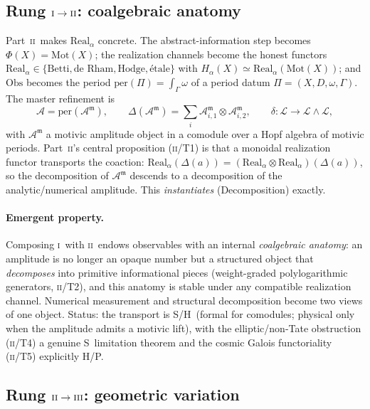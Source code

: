 \documentclass[12pt]{article}
\theoremstyle{definition}
\theoremstyle{remark}
\newcommand{\Real}{\mathrm{Real}}
\newcommand{\Obs}{\mathrm{Obs}}
\newcommand{\per}{\mathrm{per}}
\newcommand{\Sstat}{\textsf{S}}
\newcommand{\Hstat}{\textsf{H}}
\newcommand{\Pstat}{\textsf{P}}
\newcommand{\Amp}{\mathcal{A}}
\newcommand{\Ampm}{\mathcal{A}^{\mathfrak{m}}}
\newcommand{\Lcoalg}{\mathcal{L}}
\newcommand{\Mot}{\mathrm{Mot}}
\newcommand{\PI}{\textsc{i}}
\newcommand{\PII}{\textsc{ii}}
\newcommand{\PIII}{\textsc{iii}}
\begin{document}
\subsection{Rung \texorpdfstring{$\PI\to\PII$}{I to II}: coalgebraic anatomy}
\label{sec:rung2}

Part~\PII\ makes $\Real_\alpha$ concrete.  The abstract-information step becomes
$\Phi(X)=\Mot(X)$; the realization channels become the honest functors
$\Real_\alpha\in\{\text{Betti},\text{de Rham},\text{Hodge},\text{\'etale}\}$ with
$H_\alpha(X)\simeq\Real_\alpha(\Mot(X))$; and $\Obs$ becomes the period
$\per(\Pi)=\int_\Gamma\omega$ of a period datum $\Pi=(X,D,\omega,\Gamma)$.  The master
refinement is
\begin{equation}
\label{eq:ampl}
\Amp=\per(\Ampm),
\qquad
\Delta(\Ampm)=\textstyle\sum_i \Ampm_{i,1}\otimes\Ampm_{i,2},
\qquad
\delta:\Lcoalg\to\Lcoalg\wedge\Lcoalg,
\end{equation}
with $\Ampm$ a motivic amplitude object in a comodule over a Hopf algebra of motivic
periods.  Part~\PII's central proposition (\PII/T1) is that a monoidal realization
functor transports the coaction: $\Real_\alpha(\Delta(a))=(\Real_\alpha\otimes
\Real_\alpha)(\Delta(a))$, so the decomposition of $\Ampm$ descends to a decomposition
of the analytic/numerical amplitude.  This \emph{instantiates} 
(Decomposition) exactly.

\paragraph{Emergent property.}
Composing \PI\ with \PII\ endows observables with an internal \emph{coalgebraic
anatomy}: an amplitude is no longer an opaque number but a structured object that
\emph{decomposes} into primitive informational pieces (weight-graded polylogarithmic
generators, \PII/T2), and this anatomy is stable under any compatible realization
channel.  Numerical measurement and structural decomposition become two views of one
object.  Status: the transport is \Sstat/\Hstat\ (formal for comodules; physical only
when the amplitude admits a motivic lift), with the elliptic/non-Tate obstruction
(\PII/T4) a genuine \Sstat\ limitation theorem and the cosmic Galois functoriality
(\PII/T5) explicitly \Hstat/\Pstat.

\subsection{Rung \texorpdfstring{$\PII\to\PIII$}{II to III}: geometric variation}
\label{sec:rung3}
\end{document}
